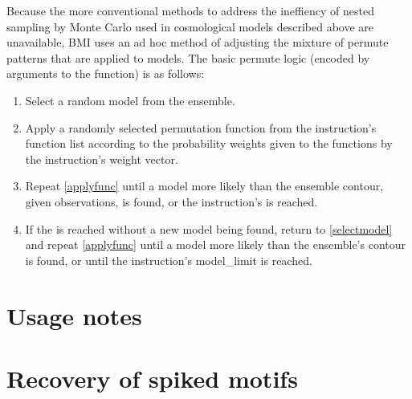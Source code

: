 Because the more conventional methods to address the ineffiency of nested sampling by Monte Carlo used in cosmological models described above are unavailable, BMI uses an ad hoc method of adjusting the mixture of permute patterns that are applied to models. The basic permute logic (encoded by  arguments to the  function) is as follows:

\begin{enumerate}
    \item\label{selectmodel} Select a random  model from the ensemble.
    \item\label{applyfunc} Apply a randomly selected permutation function from the instruction's function list according to the probability weights given to the functions by the instruction's weight vector.
    \item Repeat \ref{applyfunc} until a model more likely than the ensemble contour, given observations, is found, or the instruction's  is reached.
    \item If the  is reached without a new model being found, return to \ref{selectmodel} and repeat \ref{applyfunc} until a model more likely than the ensemble's contour is found, or until the instruction's model_limit is reached.
\end{enumerate}

\section{Usage notes}

\section{Recovery of spiked motifs}